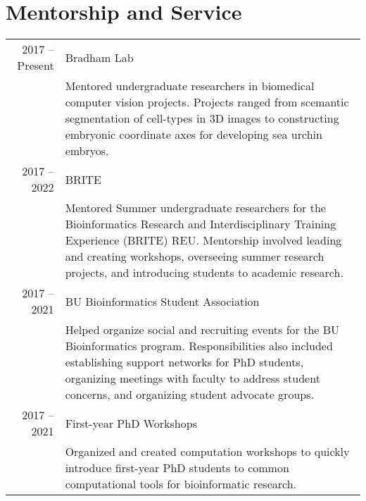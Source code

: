 \documentclass[a4paper,10pt]{article}
\begin{document}
\section{\color{linkcolour} Mentorship and Service}
\begin{tabular}{rp{10cm}}
	2017 -- Present
	 & Bradham Lab                                                                                                                                              \\
	 & \footnotesize{Mentored undergraduate researchers in biomedical computer vision projects. Projects ranged from scemantic segmentation of cell-types in 3D
		images to constructing embryonic coordinate axes for developing
	sea urchin embryos.}                                                                                                                                        \\
	2017 -- 2022
	 & BRITE                                                                                                                                                    \\
	 & \footnotesize{Mentored Summer undergraduate researchers for the
		Bioinformatics Research and Interdisciplinary Training Experience (BRITE)
		REU. Mentorship involved leading and creating workshops, overseeing
	summer research projects, and introducing students to academic research.}                                                                                   \\
	2017 -- 2021
	 & BU Bioinformatics Student Association                                                                                                                    \\
	 & \footnotesize{Helped organize social and recruiting events for the BU
		Bioinformatics program. Responsibilities also included establishing
		support networks for PhD students, organizing meetings with faculty to
	address student concerns, and organizing student advocate groups.}                                                                                          \\
	2017 -- 2021
	 & First-year PhD Workshops                                                                                                                                 \\
	 & \footnotesize{Organized and created computation workshops to quickly
		introduce first-year PhD students to common computational
	tools for bioinformatic research.}                                                                                                                          \\

\end{tabular}
\end{document}
